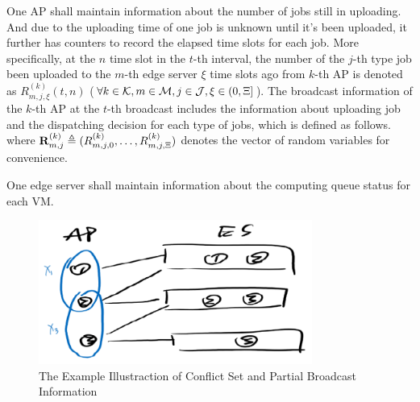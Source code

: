 One AP shall maintain information about the number of jobs still in uploading. 
And due to the uploading time of one job is unknown until it's been uploaded, it further has counters to record the elapsed time slots for each job.
More specifically, at the $n$ time slot in the $t$-th interval, the number of the $j$-th type job been uploaded to the $m$-th edge server $\xi$ time slots ago from $k$-th AP is denoted as $R^{(k)}_{m,j,\xi}({t,n})$ ($\forall k\in\mathcal{K}, m\in\mathcal{M}, j\in\mathcal{J}, \xi\in(0,\Xi]$).
The broadcast information of the $k$-th AP at the $t$-th broadcast includes the information about uploading job and the dispatching decision for each type of jobs, which is defined as follows.
where $\mathbf{R}^{(k)}_{m,j} \triangleq ( R^{(k)}_{m,j,0},\dots,R^{(k)}_{m,j,\Xi} )$ denotes the vector of random variables for convenience.

One edge server shall maintain information about the computing queue status for each VM.

\begin{figure}[ht]
    \centering
    \includegraphics[width=0.80\textwidth]{images/draft-conflict.png}
    \caption{The Example Illustraction of Conflict Set and Partial Broadcast Information}
    \label{fig:conflict}
\end{figure}

